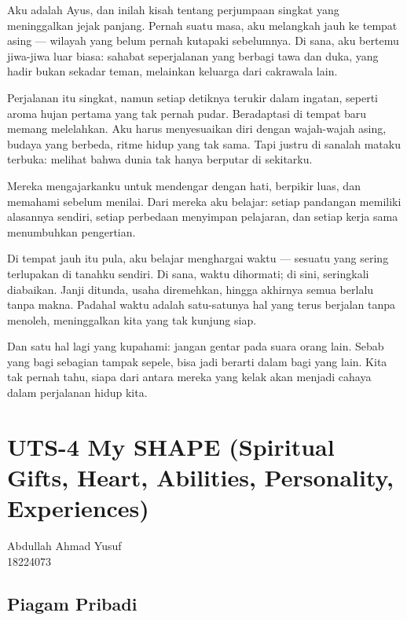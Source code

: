 \documentclass[
  letterpaper,
  DIV=11,
  numbers=noendperiod]{scrreprt}
\begin{document}
Aku adalah Ayus, dan inilah kisah tentang perjumpaan singkat yang
meninggalkan jejak panjang. Pernah suatu masa, aku melangkah jauh ke
tempat asing --- wilayah yang belum pernah kutapaki sebelumnya. Di sana,
aku bertemu jiwa-jiwa luar biasa: sahabat seperjalanan yang berbagi tawa
dan duka, yang hadir bukan sekadar teman, melainkan keluarga dari
cakrawala lain.

Perjalanan itu singkat, namun setiap detiknya terukir dalam ingatan,
seperti aroma hujan pertama yang tak pernah pudar. Beradaptasi di tempat
baru memang melelahkan. Aku harus menyesuaikan diri dengan wajah-wajah
asing, budaya yang berbeda, ritme hidup yang tak sama. Tapi justru di
sanalah mataku terbuka: melihat bahwa dunia tak hanya berputar di
sekitarku.

Mereka mengajarkanku untuk mendengar dengan hati, berpikir luas, dan
memahami sebelum menilai. Dari mereka aku belajar: setiap pandangan
memiliki alasannya sendiri, setiap perbedaan menyimpan pelajaran, dan
setiap kerja sama menumbuhkan pengertian.

Di tempat jauh itu pula, aku belajar menghargai waktu --- sesuatu yang
sering terlupakan di tanahku sendiri. Di sana, waktu dihormati; di sini,
seringkali diabaikan. Janji ditunda, usaha diremehkan, hingga akhirnya
semua berlalu tanpa makna. Padahal waktu adalah satu-satunya hal yang
terus berjalan tanpa menoleh, meninggalkan kita yang tak kunjung siap.

Dan satu hal lagi yang kupahami: jangan gentar pada suara orang lain.
Sebab yang bagi sebagian tampak sepele, bisa jadi berarti dalam bagi
yang lain. Kita tak pernah tahu, siapa dari antara mereka yang kelak
akan menjadi cahaya dalam perjalanan hidup kita.


\chapter{UTS-4 My SHAPE (Spiritual Gifts, Heart, Abilities, Personality,
Experiences)}\label{uts-4-my-shape-spiritual-gifts-heart-abilities-personality-experiences}

Abdullah Ahmad Yusuf\\
18224073

\section{Piagam Pribadi}\label{piagam-pribadi}
\end{document}
